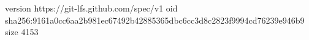 version https://git-lfs.github.com/spec/v1
oid sha256:9161a0cc6aa2b981ec67492b42885365dbc6cc3d8c2823f9994cd76239e946b9
size 4153
